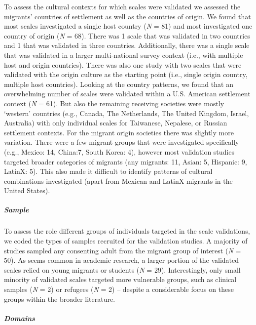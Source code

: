 To assess the cultural contexts for which scales were validated we
assessed the migrants' countries of settlement as well as the countries
of origin. We found that most scales investigated a single host country
(\textit{N} = 81) and most investigated one country of origin
(\textit{N} = 68). There was 1 scale that was validated in two countries
and 1 that was validated in three countries. Additionally, there was a
single scale that was validated in a larger multi-national survey
context (i.e., with multiple host and origin countries). There was also
one study with two scales that were validated with the origin culture as
the starting point (i.e., single origin country, multiple host
countries). Looking at the country patterns, we found that an
overwhelming number of scales were validated within a U.S. American
settlement context (\textit{N} = 61). But also the remaining receiving
societies were mostly `western' countries (e.g., Canada, The
Netherlands, The United Kingdom, Israel, Australia) with only individual
scales for Taiwanese, Nepalese, or Russian settlement contexts. For the
migrant origin societies there was slightly more variation. There were a
few migrant groups that were investigated specifically (e.g., Mexico:
14, China:7, South Korea: 4), however most validation studies targeted
broader categories of migrants (any migrants: 11, Asian: 5, Hispanic: 9,
LatinX: 5). This also made it difficult to identify patterns of cultural
combinations investigated (apart from Mexican and LatinX migrants in the
United States).

\subparagraph{Sample}

To assess the role different groups of individuals targeted in the scale
validations, we coded the types of samples recruited for the validation
studies. A majority of studies sampled any consenting adult from the
migrant group of interest (\textit{N} = 50). As seems common in academic
research, a larger portion of the validated scales relied on young
migrants or students (\textit{N} = 29). Interestingly, only small
minority of validated scales targeted more vulnerable groups, such as
clinical samples (\textit{N} = 2) or refugees (\textit{N} = 2) --
despite a considerable focus on these groups within the broader
literature.

\subparagraph{Domains}

